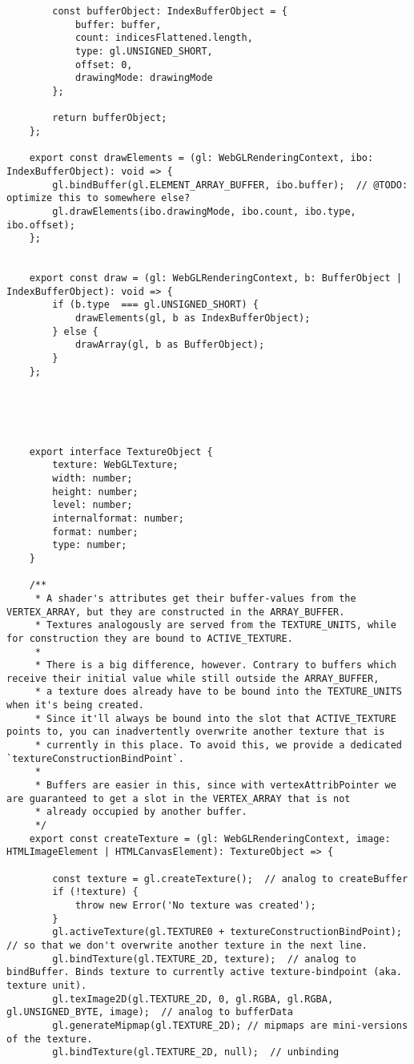 {\begin{lstlisting}
        const bufferObject: IndexBufferObject = {
            buffer: buffer,
            count: indicesFlattened.length,
            type: gl.UNSIGNED_SHORT,
            offset: 0,
            drawingMode: drawingMode
        };
    
        return bufferObject;
    };
    
    export const drawElements = (gl: WebGLRenderingContext, ibo: IndexBufferObject): void => {
        gl.bindBuffer(gl.ELEMENT_ARRAY_BUFFER, ibo.buffer);  // @TODO: optimize this to somewhere else?
        gl.drawElements(ibo.drawingMode, ibo.count, ibo.type, ibo.offset);
    };
    
    
    export const draw = (gl: WebGLRenderingContext, b: BufferObject | IndexBufferObject): void => {
        if (b.type  === gl.UNSIGNED_SHORT) {
            drawElements(gl, b as IndexBufferObject);
        } else {
            drawArray(gl, b as BufferObject);
        }
    };
    
    
    
    
    
    export interface TextureObject {
        texture: WebGLTexture;
        width: number;
        height: number;
        level: number;
        internalformat: number;
        format: number;
        type: number;
    }
    
    /**
     * A shader's attributes get their buffer-values from the VERTEX_ARRAY, but they are constructed in the ARRAY_BUFFER.
     * Textures analogously are served from the TEXTURE_UNITS, while for construction they are bound to ACTIVE_TEXTURE.
     *
     * There is a big difference, however. Contrary to buffers which receive their initial value while still outside the ARRAY_BUFFER,
     * a texture does already have to be bound into the TEXTURE_UNITS when it's being created.
     * Since it'll always be bound into the slot that ACTIVE_TEXTURE points to, you can inadvertently overwrite another texture that is
     * currently in this place. To avoid this, we provide a dedicated `textureConstructionBindPoint`.
     *
     * Buffers are easier in this, since with vertexAttribPointer we are guaranteed to get a slot in the VERTEX_ARRAY that is not
     * already occupied by another buffer.
     */
    export const createTexture = (gl: WebGLRenderingContext, image: HTMLImageElement | HTMLCanvasElement): TextureObject => {
    
        const texture = gl.createTexture();  // analog to createBuffer
        if (!texture) {
            throw new Error('No texture was created');
        }
        gl.activeTexture(gl.TEXTURE0 + textureConstructionBindPoint); // so that we don't overwrite another texture in the next line.
        gl.bindTexture(gl.TEXTURE_2D, texture);  // analog to bindBuffer. Binds texture to currently active texture-bindpoint (aka. texture unit).
        gl.texImage2D(gl.TEXTURE_2D, 0, gl.RGBA, gl.RGBA, gl.UNSIGNED_BYTE, image);  // analog to bufferData
        gl.generateMipmap(gl.TEXTURE_2D); // mipmaps are mini-versions of the texture.
        gl.bindTexture(gl.TEXTURE_2D, null);  // unbinding
    

\end{lstlisting}}

